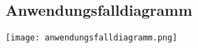\subsection{Anwendungsfalldiagramm}
\label{sec:Anhang:Anwendungsfalldiagramm}
\texttt{[image: anwendungsfalldiagramm.png]}